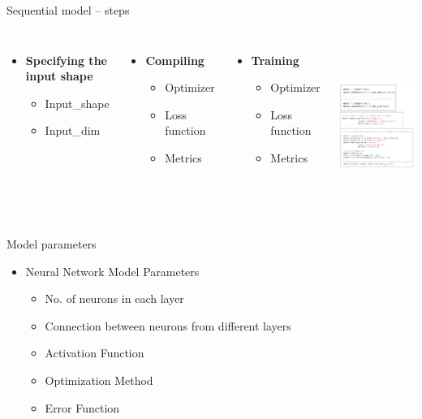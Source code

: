 \documentclass[aspectratio=169,14pt,usenames,dvipsnames]{beamer}
\begin{document}
\begin{frame}{Sequential model – steps}
\begin{columns}
\begin{itemize}
\item \textbf{Specifying the input shape}
\begin{itemize}
\item Input\_shape
\item Input\_dim
\end{itemize}
\end{itemize}

\begin{itemize}
\item \textbf{Compiling}
\begin{itemize}
\item Optimizer
\item Loss function
\item Metrics
\end{itemize}
\end{itemize}

\begin{itemize}
\item \textbf{Training}
\begin{itemize}
\item Optimizer
\item Loss function
\item Metrics
\end{itemize}
\end{itemize}


\includegraphics[width=6cm, height=5.5cm]{Keras_Images/Ker_4.png}
\end{columns}
\end{frame}


\begin{frame}{Model parameters}
\begin{itemize}
\item Neural Network Model Parameters
\begin{itemize}
\item No. of neurons in each layer
\item Connection between neurons from different layers
\item Activation Function
\item Optimization Method
\item Error Function
\end{itemize}
\end{itemize}

\end{frame}
\end{document}
